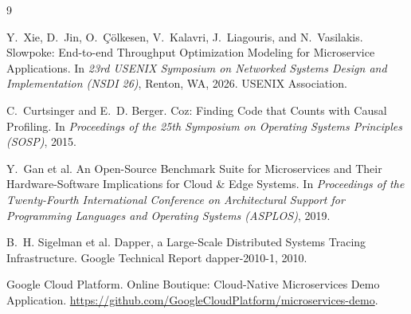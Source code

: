 \begin{thebibliography}{9}

Y.~Xie, D.~Jin, O.~{\c C}{\"o}lkesen, V.~Kalavri, J.~Liagouris, and
N.~Vasilakis.
\newblock Slowpoke: End-to-end Throughput Optimization Modeling for
  Microservice Applications.
\newblock In \emph{23rd USENIX Symposium on Networked Systems Design and
  Implementation (NSDI 26)}, Renton, WA, 2026. USENIX Association.

C.~Curtsinger and E.~D. Berger.
\newblock Coz: Finding Code that Counts with Causal Profiling.
\newblock In \emph{Proceedings of the 25th Symposium on Operating Systems
  Principles (SOSP)}, 2015.

Y.~Gan et al.
\newblock An Open-Source Benchmark Suite for Microservices and Their
  Hardware-Software Implications for Cloud \& Edge Systems.
\newblock In \emph{Proceedings of the Twenty-Fourth International
  Conference on Architectural Support for Programming Languages and
  Operating Systems (ASPLOS)}, 2019.

B.~H. Sigelman et al.
\newblock Dapper, a Large-Scale Distributed Systems Tracing Infrastructure.
\newblock Google Technical Report dapper-2010-1, 2010.

Google Cloud Platform.
\newblock Online Boutique: Cloud-Native Microservices Demo Application.
\newblock \url{https://github.com/GoogleCloudPlatform/microservices-demo}.

\end{thebibliography}


